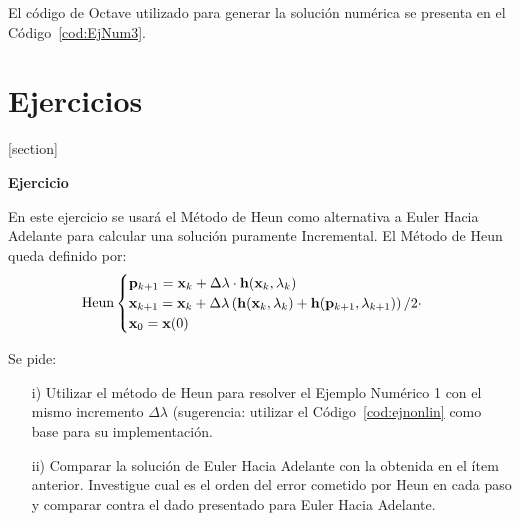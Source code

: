 El código de Octave utilizado para generar la solución numérica se presenta en el Código~\ref{cod:EjNum3}.











\section{Ejercicios}

[section]
\newenvironment{exercise}[1][]{\addtocounter{numEjer}{1} \noindent \textbf{Ejercicio \arabic{numEjer} #1}}{}





\bigskip
\begin{exercise}
	
	En este ejercicio se usará el Método de Heun como alternativa a Euler Hacia Adelante para calcular una solución puramente Incremental.  El Método de Heun queda definido por:
	\begin{equation*}
		\text{Heun}
		\begin{cases} 
			{\bf p}_{k+1} = {\bf x}_k + \Delta \lambda \cdot {\bf h}({\bf x}_k,\lambda_k) \\
			{\bf x}_{k+1}= {\bf x}_k + \Delta \lambda \left({\bf h}({\bf x}_k,\lambda_k) + {\bf h}({\bf p}_{k+1},\lambda_{k+1}) \right)/2\cdot  \\
			{\bf x}_0={\bf x}(0)
		\end{cases}
	\end{equation*}
	
	Se pide:
	\begin{itemize}
		\item[i)] Utilizar el método de Heun para resolver el Ejemplo Numérico 1 con el mismo incremento $\Delta \lambda$ (sugerencia: utilizar el Código~\ref{cod:ejnonlin} como base para su implementación.
		\item[ii)] Comparar la solución de Euler Hacia Adelante con la obtenida en el ítem anterior. Investigue cual es el orden del error cometido por Heun en cada paso y comparar contra el dado presentado para Euler Hacia Adelante.
	\end{itemize}
\end{exercise}

